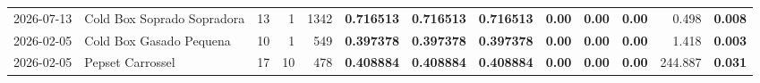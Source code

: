 {\begin{center}
{\begin{tabular}{@{}llrrrrrrrrrrr@{}}
2026-07-13 & Cold Box Soprado Sopradora & 13 & 1 & 1342 & \textbf{0.716513} & \textbf{0.716513} & \textbf{0.716513} & \textbf{0.00} & \textbf{0.00} & \textbf{0.00} & 0.498 & \textbf{0.008} \\
2026-02-05 & Cold Box Gasado Pequena & 10 & 1 & 549 & \textbf{0.397378} & \textbf{0.397378} & \textbf{0.397378} & \textbf{0.00} & \textbf{0.00} & \textbf{0.00} & 1.418 & \textbf{0.003} \\
2026-02-05 & Pepset Carrossel & 17 & 10 & 478 & \textbf{0.408884} & \textbf{0.408884} & \textbf{0.408884} & \textbf{0.00} & \textbf{0.00} & \textbf{0.00} & 244.887 & \textbf{0.031} \\
\bottomrule
\end{tabular}%
}
\end{center}
}
\newpage
\vspace*{\fill}
